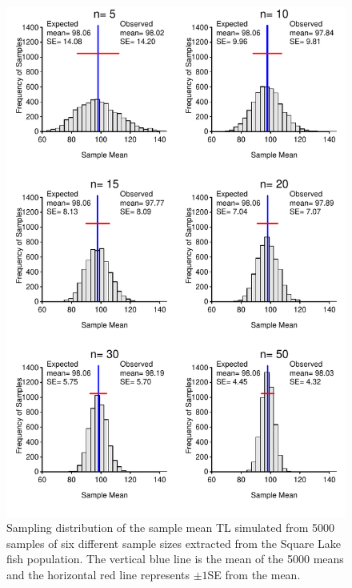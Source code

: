 \documentclass[10pt,openany]{book}\usepackage[]{graphicx}\usepackage[]{color}
\newenvironment{knitrout}{}{} %
\begin{document}
\begin{knitrout}
\color{fgcolor}\begin{figure}[hbtp]

{\centering \includegraphics[width=.8\linewidth]{Figs/SampDistSLMeann-1} 

}

\caption[Sampling distribution of sample means from Square Lake]{Sampling distribution of the sample mean TL simulated from 5000 samples of six different sample sizes extracted from the Square Lake fish population.  The vertical blue line is the mean of the 5000 means and the horizontal red line represents $\pm1$SE from the mean.}\label{fig:SampDistSLMeann}
\end{figure}


\end{knitrout}
\vspace{12pt}  %
\end{document}
